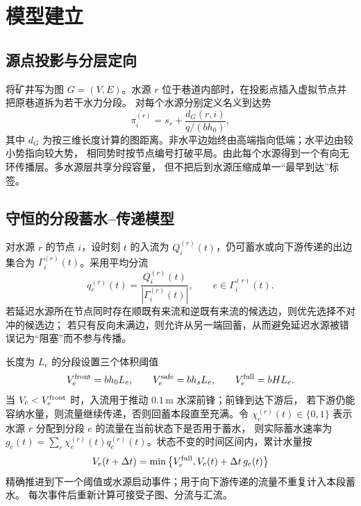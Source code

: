 \section{模型建立}

\subsection{源点投影与分层定向}
将矿井写为图 $G=(V,E)$。水源 $r$ 位于巷道内部时，在投影点插入虚拟节点并把原巷道拆为若干水力分段。
对每个水源分别定义名义到达势
\begin{equation}
  \pi_i^{(r)}=s_r+\frac{d_G(r,i)}{q/(bh_0)},
\end{equation}
其中 $d_G$ 为按三维长度计算的图距离。非水平边始终由高端指向低端；水平边由较小势指向较大势，
相同势时按节点编号打破平局。由此每个水源得到一个有向无环传播层。多水源层共享分段容量，
但不把后到水源压缩成单一“最早到达”标签。

\subsection{守恒的分段蓄水--传递模型}
对水源 $r$ 的节点 $i$，设时刻 $t$ 的入流为 $Q_i^{(r)}(t)$，仍可蓄水或向下游传递的出边集合为
$\Gamma_i^{(r)}(t)$。采用平均分流
\begin{equation}
 q_e^{(r)}(t)=\frac{Q_i^{(r)}(t)}{|\Gamma_i^{(r)}(t)|},
 \qquad e\in\Gamma_i^{(r)}(t).
\end{equation}
若延迟水源所在节点同时存在顺既有来流和逆既有来流的候选边，则优先选择不对冲的候选边；
若只有反向未满边，则允许从另一端回蓄，从而避免延迟水源被错误记为“阻塞”而不参与传播。

长度为 $L_e$ 的分段设置三个体积阈值
\begin{equation}
 V_e^{\rm front}=bh_0L_e,\qquad
 V_e^{\rm safe}=bh_sL_e,\qquad
 V_e^{\rm full}=bHL_e.
 \label{eq:thresholds}
\end{equation}
当 $V_e<V_e^{\rm front}$ 时，入流用于推动 $0.1\,\mathrm{m}$ 水深前锋；前锋到达下游后，
若下游仍能容纳水量，则流量继续传递，否则回蓄本段直至充满。令
$\chi_e^{(r)}(t)\in\{0,1\}$ 表示水源 $r$ 分配到分段 $e$ 的流量在当前状态下是否用于蓄水，
则实际蓄水速率为 $g_e(t)=\sum_r\chi_e^{(r)}(t)q_e^{(r)}(t)$。状态不变的时间区间内，累计水量按
\begin{equation}
 V_e(t+\Delta t)=\min\left\{V_e^{\rm full},
 V_e(t)+\Delta t\,g_e(t)\right\}
 \label{eq:volume-update}
\end{equation}
精确推进到下一个阈值或水源启动事件；用于向下游传递的流量不重复计入本段蓄水。
每次事件后重新计算可接受子图、分流与汇流。

